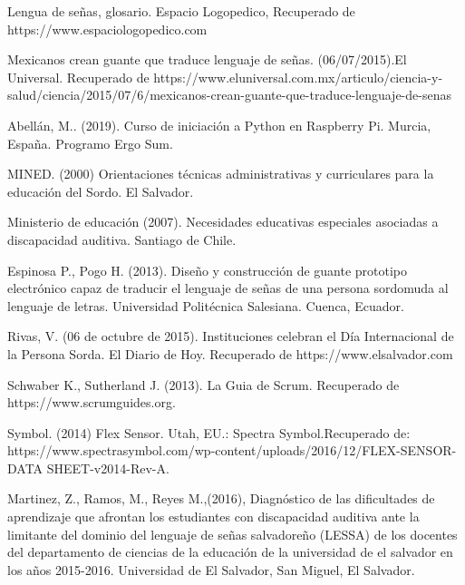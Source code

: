 \documentclass[12pt]{report}%
\begin{document}
Lengua de señas, glosario. Espacio Logopedico, Recuperado de https://www.espaciologopedico.com

Mexicanos crean guante que traduce lenguaje de señas. (06/07/2015).El Universal. Recuperado de https://www.eluniversal.com.mx/articulo/ciencia-y-salud/ciencia/2015/07/6/mexicanos-crean-guante-que-traduce-lenguaje-de-senas

Abellán, M.. (2019). Curso de iniciación a Python en Raspberry Pi. Murcia, España. Programo Ergo Sum.

MINED. (2000) Orientaciones técnicas administrativas y curriculares para la educación del Sordo. El Salvador.

Ministerio de educación (2007). Necesidades educativas especiales asociadas a discapacidad auditiva. Santiago de Chile.

Espinosa P.,  Pogo H. (2013). Diseño y construcción de guante prototipo electrónico capaz de traducir el lenguaje de señas de una persona sordomuda al lenguaje de letras. Universidad Politécnica Salesiana. Cuenca, Ecuador.

Rivas, V. (06 de octubre de 2015). Instituciones celebran el Día Internacional de la Persona Sorda. El Diario de Hoy. Recuperado de https://www.elsalvador.com

Schwaber K., Sutherland J. (2013). La Guia de Scrum. Recuperado de https://www.scrumguides.org.

Symbol. (2014) Flex Sensor. Utah, EU.: Spectra Symbol.Recuperado de: https://www.spectrasymbol.com/wp-content/uploads/2016/12/FLEX-SENSOR-DATA SHEET-v2014-Rev-A.

Martinez, Z., Ramos, M.,  Reyes M.,(2016), Diagnóstico de las dificultades de aprendizaje que afrontan los estudiantes con discapacidad auditiva ante la limitante del dominio del lenguaje de señas salvadoreño (LESSA) de los docentes del departamento de ciencias de la educación de la universidad de el salvador en los años 2015-2016. Universidad de El Salvador, San Miguel, El Salvador.










\end{document}
